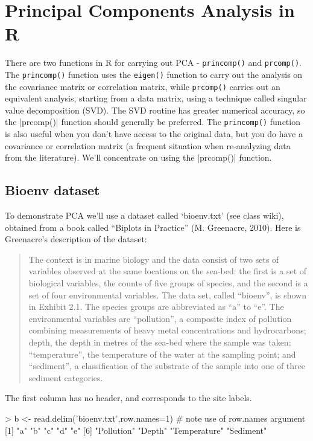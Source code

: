 
\section{Principal Components Analysis in R}

There are two functions in R for carrying out PCA - \lstinline!princomp()! and
\lstinline!prcomp()!. The \lstinline!princomp()! function uses the
\lstinline!eigen()! function to carry out the analysis on the covariance
matrix or correlation matrix, while \lstinline!prcomp()! carries out an
equivalent analysis, starting from a data matrix, using a technique called
singular value decomposition (SVD). The SVD routine has greater numerical
accuracy, so the |prcomp()| function should generally be preferred. The
\lstinline!princomp()! function is also useful when you don't have access to
the original data, but you do have a covariance or correlation matrix (a
frequent situation when re-analyzing data from the literature). We'll concentrate on using the |prcomp()| function.


\subsection{Bioenv dataset}
To demonstrate PCA we'll use a dataset called `bioenv.txt' (see class wiki), obtained from a book called ``Biplots in Practice'' (M. Greenacre, 2010). Here is Greenacre's description of the dataset:

\begin{quote}
  The context is in marine biology and the data consist of two sets of variables observed at the same locations on the sea-bed: the first is a set of biological variables, the counts of five groups of species, and the second is a set of four environmental variables. The data set, called ``bioenv'', is shown in Exhibit 2.1. The species groups are abbreviated as ``a'' to ``e''. The environmental variables are ``pollution'', a composite index of pollution combining measurements of heavy metal concentrations and hydrocarbons; depth, the depth in metres of the sea-bed where the sample was taken; ``temperature'', the temperature of the water at the sampling point; and ``sediment'', a classification of the substrate of the sample into one of three sediment categories.
\end{quote}

The first column has no header, and corresponds to the site labels.
%
\begin{R}
> b <- read.delim('bioenv.txt',row.names=1) # note use of row.names argument
[1] "a"           "b"           "c"           "d"           "e"
[6] "Pollution"   "Depth"       "Temperature" "Sediment"
\end{R}

